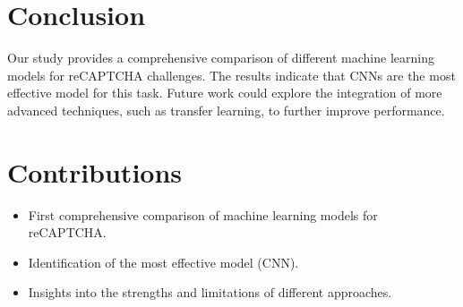 \documentclass{article}
\begin{document}
\section{Conclusion}
Our study provides a comprehensive comparison of different machine learning models for reCAPTCHA challenges. The results indicate that CNNs are the most effective model for this task. Future work could explore the integration of more advanced techniques, such as transfer learning, to further improve performance.

\section{Contributions}
\begin{itemize}
    \item First comprehensive comparison of machine learning models for reCAPTCHA.
    \item Identification of the most effective model (CNN).
    \item Insights into the strengths and limitations of different approaches.
\end{itemize}



\end{document}

